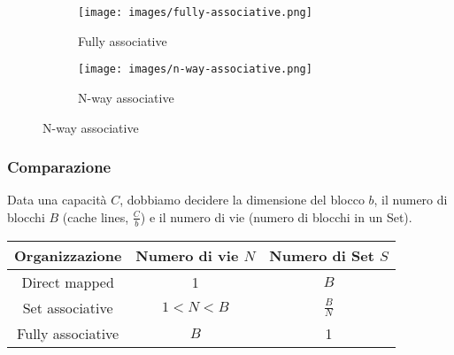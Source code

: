 \begin{figure}[h!]
	\centering
	\begin{subfigure}{.45\textwidth}
		\centering
		\texttt{[image: images/fully-associative.png]}
		\caption{Fully associative}
	\end{subfigure}
	\begin{subfigure}{.45\textwidth}
		\centering
		\texttt{[image: images/n-way-associative.png]}
		\caption{N-way associative}
	\end{subfigure}
\end{figure}

\subsubsection{Comparazione}
Data una capacità $C$, dobbiamo decidere la dimensione del blocco $b$, il numero di blocchi $B$ (cache lines, $\frac{C}{b}$) e il numero di vie (numero di blocchi in un Set).
\begin{table}[h]
	\centering
	\begin{tabular}{|c|c|c|}
		\hline
		Organizzazione & Numero di vie $N$ & Numero di Set $S$ \\
		\hline
		Direct mapped & 1 & $B$ \\
		Set associative & $1<N<B$ & $\frac{B}{N}$ \\
		Fully associative & $B$ & 1\\
		\hline
	\end{tabular}
\end{table}

